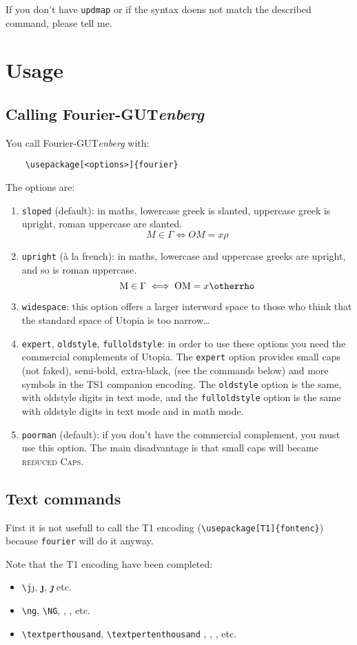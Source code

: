 \documentclass[a4paper,11pt]{article}
\newcommand{\fourier}{Fourier-GUT\textit{enberg}}
\begin{document}
If you don't have \texttt{updmap} or if the syntax doens not match the described command, please tell me.

\section{Usage}
\subsection{Calling \fourier}
You call \fourier{} with: 
\begin{verbatim}
    \usepackage[<options>]{fourier}
\end{verbatim}
The options are:
\begin{enumerate}
\item \texttt{sloped} (default): in maths, lowercase greek is slanted, uppercase greek is upright, roman uppercase are slanted.
\[M\in\Gamma \iff OM=x\rho\]
\item \texttt{upright} (à la french): in maths, lowercase and uppercase greeks are upright, and so is roman uppercase.
\[\mathrm{M}\in\Gamma \iff \mathrm{OM}=x\otherrho\]
\item \texttt{widespace}: this option offers a larger interword space to those who think that the standard space of Utopia is too narrow\ldots
\item \texttt{expert}, \texttt{oldstyle}, \texttt{fulloldstyle}: in order to use these options you need the commercial complements of Utopia.
The \texttt{expert} option provides small caps (not faked), semi-bold, extra-black, (see the commands below) and more symbols in the TS1 companion encoding. The \texttt{oldstyle} option is the same, with oldstyle digits in text mode, and the \texttt{fulloldstyle} option is the same with oldstyle digits in text mode and in math mode.
\item \texttt{poorman} (default): if you don't have the commercial complement, you must use this option. The main disadvantage is that small caps will became \textsc{reduced Caps}.
\end{enumerate}
\subsection{Text commands}
First it is not usefull to call the T1 encoding (\verb=\usepackage[T1]{fontenc}=) 
because \verb=fourier= will do it anyway.

Note that the T1 encoding have been completed:
\begin{itemize}
\item \verb=\j=\quad \j, \textbf{\j}, \textit{\bfseries\j} etc. 
\item \verb=\ng=, \verb=\NG=\quad \ng, \NG, \textit{\ng}, 
\textbf{\NG} etc.
\item \verb=\textperthousand=, \verb=\textpertenthousand= \quad 
\textperthousand, \textpertenthousand, \textbf{\textperthousand}, 
\textbf{\itshape\textpertenthousand} etc.
\end{itemize}
\end{document}
